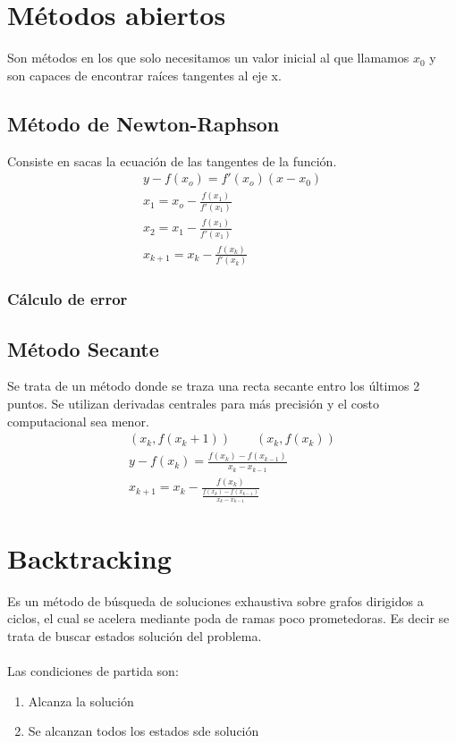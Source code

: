 \section{M\'etodos abiertos}
Son m\'etodos en los que solo necesitamos un valor inicial al que llamamos $x_0$ y son capaces de encontrar ra\'ices tangentes al eje x.

\subsection{M\'etodo de Newton-Raphson}
Consiste en sacas la ecuaci\'on de las tangentes de la funci\'on.
\begin{gather}
y-f(x_o)=f'(x_o)(x-x_0) \\
x_1=x_o-\frac{f(x_1)}{f'(x_1)} \\
x_2=x_1-\frac{f(x_1)}{f'(x_1)} \\
\boxed{x_{k+1}=x_k-\frac{f(x_k)}{f'(x_k)}}
\end{gather}
\subsubsection*{C\'alculo de error}

\subsection{M\'etodo Secante}
Se trata de un m\'etodo donde se traza una recta secante entro los \'ultimos 2 puntos. Se utilizan derivadas centrales para m\'as precisi\'on y el costo computacional sea menor.
\begin{gather}
\nonumber(x_k,f(x_k+1)) \qquad (x_k,f(x_k))\\
y-f(x_k)=\frac{f(x_k)-f(x_{k-1})}{x_k-x_{k-1}}\\
\boxed{x_{k+1}=x_k-\frac{f(x_k)}{\frac{f(x_k)-f(x_{k-1})}{x_k-x_{k-1}}}}
\end{gather}
\section*{Backtracking}
Es un m\'etodo de b\'usqueda de soluciones exhaustiva sobre grafos dirigidos a ciclos, el cual se acelera mediante poda de ramas poco prometedoras. Es decir se trata de buscar estados soluci\'on del problema. \\
\\
Las condiciones de partida son:
\begin{enumerate}
\item Alcanza la soluci\'on
\item Se alcanzan todos los estados sde soluci\'on
\end{enumerate}


